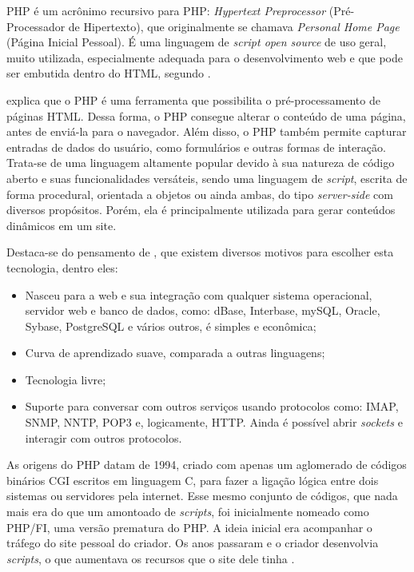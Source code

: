 PHP é um acrônimo recursivo para PHP: \textit{Hypertext Preprocessor} (Pré-Processador de Hipertexto), que originalmente se chamava \textit{Personal Home Page} (Página Inicial Pessoal). É uma linguagem de \textit{script open source} de uso geral, muito utilizada, especialmente adequada para o desenvolvimento web e que pode ser embutida dentro do HTML, segundo . %

 explica que o PHP é uma ferramenta que possibilita o pré-processamento de páginas HTML. Dessa forma, o PHP consegue alterar o conteúdo de uma página, antes de enviá-la para o navegador. Além disso, o PHP também permite capturar entradas de dados do usuário, como formulários e outras formas de interação. Trata-se de uma linguagem altamente popular devido à sua natureza de código aberto e suas funcionalidades versáteis, sendo uma linguagem de \textit{script}, escrita de forma procedural, orientada a objetos ou ainda ambas, do tipo \textit{server-side} com diversos propósitos. Porém, ela é principalmente utilizada para gerar conteúdos dinâmicos em um site.

Destaca-se do pensamento de , que existem diversos motivos para escolher esta tecnologia, dentro eles:

\begin{itemize}
    \item Nasceu para a web e sua integração com qualquer sistema operacional, servidor web e banco de dados, como: dBase, Interbase, mySQL, Oracle, Sybase, PostgreSQL e vários outros, é simples e econômica;
    \item Curva de aprendizado suave, comparada a outras linguagens;
    \item Tecnologia livre;
    \item Suporte para conversar com outros serviços usando protocolos como: IMAP, SNMP, NNTP, POP3 e, logicamente, HTTP. Ainda é possível abrir \textit{sockets} e interagir com outros protocolos.
\end{itemize}

As origens do PHP datam de 1994, criado com apenas um aglomerado de códigos binários CGI escritos em linguagem C, para fazer a ligação lógica entre dois sistemas ou servidores pela internet. Esse mesmo conjunto de códigos, que nada mais era do que um amontoado de \textit{scripts}, foi inicialmente nomeado como PHP/FI, uma versão prematura do PHP. A ideia inicial era acompanhar o tráfego do site pessoal do criador. Os anos passaram e o criador desenvolvia \textit{scripts}, o que aumentava os recursos que o site dele tinha \cite{phpdevelopment}.


